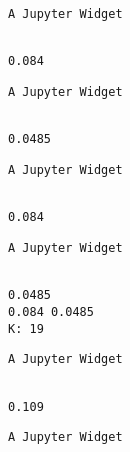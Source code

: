 \documentclass[11pt]{article}
\begin{document}
    
    \begin{verbatim}
A Jupyter Widget
    \end{verbatim}

    
    \begin{Verbatim}[commandchars=\\\{\}]

0.084

    \end{Verbatim}

    
    \begin{verbatim}
A Jupyter Widget
    \end{verbatim}

    
    \begin{Verbatim}[commandchars=\\\{\}]

0.0485

    \end{Verbatim}

    
    \begin{verbatim}
A Jupyter Widget
    \end{verbatim}

    
    \begin{Verbatim}[commandchars=\\\{\}]

0.084

    \end{Verbatim}

    
    \begin{verbatim}
A Jupyter Widget
    \end{verbatim}

    
    \begin{Verbatim}[commandchars=\\\{\}]

0.0485
0.084 0.0485
K: 19

    \end{Verbatim}

    
    \begin{verbatim}
A Jupyter Widget
    \end{verbatim}

    
    \begin{Verbatim}[commandchars=\\\{\}]

0.109

    \end{Verbatim}

    
    \begin{verbatim}
A Jupyter Widget
    \end{verbatim}
\end{document}
